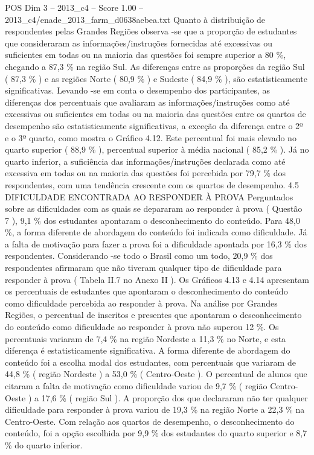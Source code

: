 \begin{textsample}{POS Dim 3 – 2013\_c4 – Score 1.00 – 2013\_c4/enade\_2013\_farm\_d0638aebea.txt}
Quanto à distribuição de respondentes pelas Grandes Regiões observa -se que a proporção de estudantes que consideraram as informações/instruções fornecidas até excessivas ou suficientes em todas ou na maioria das questões foi sempre superior a 80 \%, chegando a 87,3 \% na região Sul.
As diferenças entre as proporções da região Sul ( 87,3 \% ) e as regiões Norte ( 80,9 \% ) e Sudeste ( 84,9 \% ), são estatisticamente significativas.
Levando -se em conta o desempenho dos participantes, as diferenças dos percentuais que avaliaram as informações/instruções como até excessivas ou suficientes em todas ou na maioria das questões entre os quartos de desempenho são estatisticamente significativas, a exceção da diferença entre o 2º e o 3º quarto, como mostra o Gráfico 4.12.
Este percentual foi mais elevado no quarto superior ( 88,9 \% ), percentual superior à média nacional ( 85,2 \% ).
Já no quarto inferior, a suficiência das informações/instruções declarada como até excessiva em todas ou na maioria das questões foi percebida por 79,7 \% dos respondentes, com uma tendência crescente com os quartos de desempenho. 4.5 DIFICULDADE ENCONTRADA AO RESPONDER À PROVA Perguntados sobre as dificuldades com as quais se depararam ao responder à prova ( Questão 7 ), 9,1 \% dos estudantes apontaram o desconhecimento do conteúdo.
Para 48,0 \%, a forma diferente de abordagem do conteúdo foi indicada como dificuldade.
Já a falta de motivação para fazer a prova foi a dificuldade apontada por 16,3 \% dos respondentes.
Considerando -se todo o Brasil como um todo, 20,9 \% dos respondentes afirmaram que não tiveram qualquer tipo de dificuldade para responder à prova ( Tabela II.7 no Anexo II ).
Os Gráficos 4.13 e 4.14 apresentam os percentuais de estudantes que apontaram o desconhecimento do conteúdo como dificuldade percebida ao responder à prova.
Na análise por Grandes Regiões, o percentual de inscritos e presentes que apontaram o desconhecimento do conteúdo como dificuldade ao responder à prova não superou 12 \%.
Os percentuais variaram de 7,4 \% na região Nordeste a 11,3 \% no Norte, e esta diferença é estatisticamente significativa.
A forma diferente de abordagem do conteúdo foi a escolha modal dos estudantes, com percentuais que variaram de 44,8 \% ( região Nordeste ) a 53,0 \% ( Centro-Oeste ).
O percentual de alunos que citaram a falta de motivação como dificuldade variou de 9,7 \% ( região Centro-Oeste ) a 17,6 \% ( região Sul ).
A proporção dos que declararam não ter qualquer dificuldade para responder à prova variou de 19,3 \% na região Norte a 22,3 \% na Centro-Oeste.
Com relação aos quartos de desempenho, o desconhecimento do conteúdo, foi a opção escolhida por 9,9 \% dos estudantes do quarto superior e 8,7 \% do quarto inferior.

\end{textsample}
